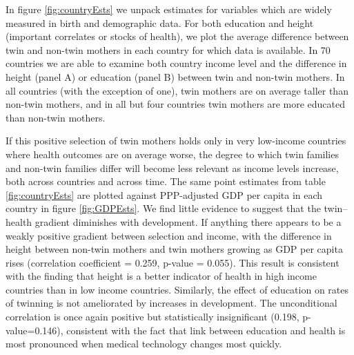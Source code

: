 \documentclass{nature}
\begin{document}
\begin{linenumbers}
In figure \ref{fig:countryEsts} we unpack estimates for variables which are widely measured in birth and demographic data.  For both education and height (important correlates or stocks of health), we plot the average difference between twin and non-twin mothers in each country for which data is available.  In 70 countries we are able to examine both country income level and the difference in height (panel A) or education (panel B) between twin and non-twin mothers.  In all countries (with the exception of one), twin mothers are on average taller than non-twin mothers, and in all but four countries twin mothers are more educated than non-twin mothers.

If this positive selection of twin mothers holds only in very low-income countries where health outcomes are on average worse, the degree to which twin families and non-twin families differ will become less relevant as income levels increase, both across countries and across time.   The same point estimates from table \ref{fig:countryEsts} are plotted against PPP-adjusted GDP per capita in each country in figure \ref{fig:GDPEsts}.  We find little evidence to suggest that the twin--health gradient diminishes with development.  If anything there appears to be a weakly positive gradient between selection and income, with the difference in height between non-twin mothers and twin mothers growing as GDP per capita rises (correlation coefficient = 0.259, p-value = 0.055).   This result is consistent with the finding that height is a better indicator of health in high income countries than in low income countries\cite{Deaton2007}.  Similarly, the effect of education on rates of twinning is not ameliorated by increases in development.  The unconditional correlation is once again positive but statistically insignificant (0.198, p-value=0.146), consistent with the fact that link between education and health is most pronounced when medical technology changes most quickly\cite{LlerasMuneyGlied2008}.


\end{linenumbers}
\end{document}
